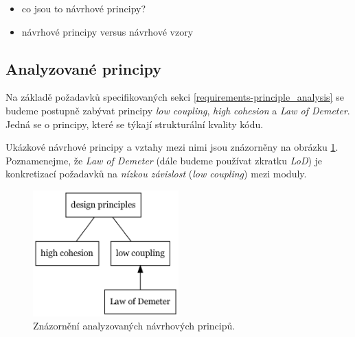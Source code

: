 


\begin{itemize}
\item co jsou to návrhové principy?
\item návrhové principy versus návrhové vzory \cite{612257}
\end{itemize}

\subsection{Analyzované principy}
Na základě požadavků specifikovaných sekci \ref{requirements-principle_analysis} se budeme postupně zabývat principy \emph{low coupling}, \emph{high cohesion} a \emph{Law of Demeter}. Jedná se o principy, které se týkají strukturální kvality kódu.

Ukázkové návrhové principy a vztahy mezi nimi jsou znázorněny na obrázku \ref{analyzed_principles}. Poznamenejme, že \emph{Law of Demeter} (dále budeme používat zkratku \emph{LoD}) je konkretizací požadavků na \emph{nízkou závislost} (\emph{low coupling}) mezi moduly.

\begin{figure}[h!]
  \centering
  \includegraphics[width=0.5\textwidth]{./graphs/oop_design_principles.png}
  \caption{Znázornění analyzovaných návrhových principů.\label{analyzed_principles}}
\end{figure}

